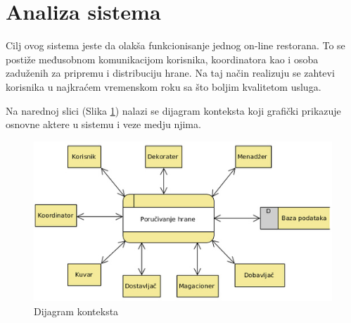 
\section{Analiza sistema}
Cilj ovog sistema jeste da olakša funkcionisanje jednog on-line restorana. To se postiže međusobnom komunikacijom korisnika, koordinatora kao i oso\-ba zaduženih za pripremu i distribuciju hrane. Na taj način realizuju se zahtevi korisnika u najkraćem vremenskom roku sa što boljim kvalitetom usluga.

Na narednoj slici (Slika \ref{fig:slika1}) nalazi se dijagram konteksta koji grafički prikazuje osnovne aktere u sistemu i veze medju njima.



\begin{figure}[ht]
    \leavevmode
    \begin{center}
    \includegraphics[height=0.3\textheight]{slike/DC.jpg}
    \end{center}
    \caption{Dijagram konteksta} %
    \label{fig:slika1}
\end{figure}






